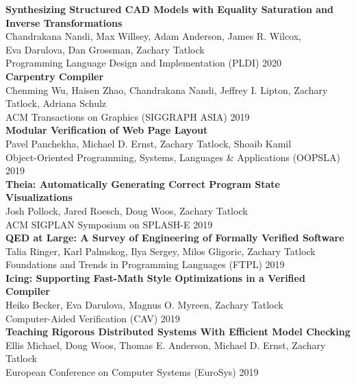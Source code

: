 \documentclass[10pt]{article}
\begin{document}
\textbf{%
Synthesizing Structured CAD Models with
Equality Saturation and Inverse Transformations
} \\
Chandrakana Nandi, Max Willsey, Adam Anderson, James R. Wilcox, \\
Eva Darulova, Dan Grossman, Zachary Tatlock \\
Programming Language Design and Implementation (PLDI) 2020 \\

\textbf{%
Carpentry Compiler
} \\
Chenming Wu, Haisen Zhao, Chandrakana Nandi, Jeffrey I. Lipton, Zachary Tatlock, Adriana Schulz \\
ACM Transactions on Graphics (SIGGRAPH ASIA) 2019 \\

\textbf{%
Modular Verification of Web Page Layout
} \\
Pavel Panchekha, Michael D. Ernst, Zachary Tatlock, Shoaib Kamil \\
Object-Oriented Programming, Systems, Languages \& Applications (OOPSLA) 2019 \\

\textbf{%
Theia: Automatically Generating Correct Program State Visualizations
} \\
Josh Pollock, Jared Roesch, Doug Woos, Zachary Tatlock \\
ACM SIGPLAN Symposium on SPLASH-E 2019 \\

\textbf{%
QED at Large: A Survey of Engineering of Formally Verified Software
} \\
Talia Ringer, Karl Palmskog, Ilya Sergey, Milos Gligoric, Zachary Tatlock \\
Foundations and Trends in Programming Languages (FTPL) 2019 \\

\textbf{%
Icing: Supporting Fast-Math Style Optimizations in a Verified Compiler
} \\
Heiko Becker, Eva Darulova, Magnus O. Myreen, Zachary Tatlock \\
Computer-Aided Verification (CAV) 2019 \\

\textbf{%
Teaching Rigorous Distributed Systems With Efficient Model Checking
} \\
Ellis Michael, Doug Woos, Thomas E. Anderson, Michael D. Ernst, Zachary Tatlock \\
European Conference on Computer Systems (EuroSys) 2019 \\
\end{document}

